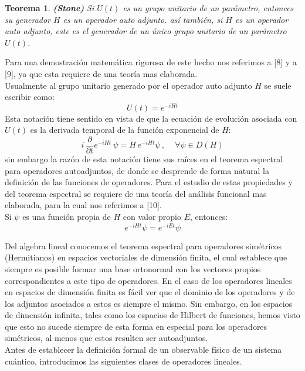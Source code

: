 \documentclass[12pt]{book}
\numberwithin{equation}{chapter}
\newtheorem{theorem}{Teorema}[chapter]
\begin{document}
\begin{theorem}\label{stone} {\bf (Stone)}
Si $U(t)$ es un grupo unitario de un par\'ametro, entonces su generador $H$ es un operador auto adjunto. as\'i tambi\'en, si $H$ es un operador auto adjunto, este es el generador de un \'unico grupo unitario de un par\'ametro $U(t)$.
\end{theorem}
Para una demostraci\'on matem\'atica rigurosa de este hecho nos referimos a [8] y a [9], ya que esta requiere de una teor\'ia mas elaborada.\\
Usualmente al grupo unitario generado por el operador auto adjunto $H$ se suele escribir como:
\begin{equation}
U(t)= e^{-iHt}
\end{equation}
Esta notaci\'on tiene sentido en vista de que la ecuaci\'on de evoluci\'on asociada con $U(t)$ es la derivada temporal de la funci\'on exponencial de $H$:
\begin{equation}
i \, \frac{\partial}{\partial t}e^{-iHt}\, \psi = H\, e^{-iHt}\psi \,,\,\,\,\,\,\,\, \forall \psi \in D(H)
\end{equation}
sin embargo la raz\'on de esta notaci\'on tiene sus ra\'ices en el teorema espectral para operadores autoadjuntos, de donde se desprende de forma natural la definici\'on de las funciones de operadores. Para el estudio de estas propiedades y del teorema espectral se requiere de una teor\'ia del an\'alisis funcional mas elaborada, para la cual nos referimos a [10].\\

Si $\psi$ es una funci\'on propia de $H$ con valor propio $E$, entonces:
\begin{equation}
e^{-iHt} \psi = e^{-iEt}\psi 
\end{equation}

Del algebra lineal conocemos el teorema espectral para operadores sim\'etricos (Hermitianos) en espacios vectoriales de dimensi\'on finita, el cual establece que siempre es posible formar una base ortonormal con los vectores propios correspondientes a este tipo de operadores.  En el caso de los operadores lineales en espacios de dimensi\'on finita es f\'acil ver que el dominio de los operadores y de los adjuntos asociados a estos es siempre el mismo. Sin embargo, en los espacios de dimensi\'on infinita, tales como los espacios de Hilbert de funciones, hemos visto que esto no sucede siempre de esta forma en especial para los operadores sim\'etricos, al menos que estos resulten ser autoadjuntos. \\
Antes de establecer la definici\'on formal de un observable f\'isico de un sistema cu\'antico, introducimos las siguientes clases de operadores lineales.
\end{document}
